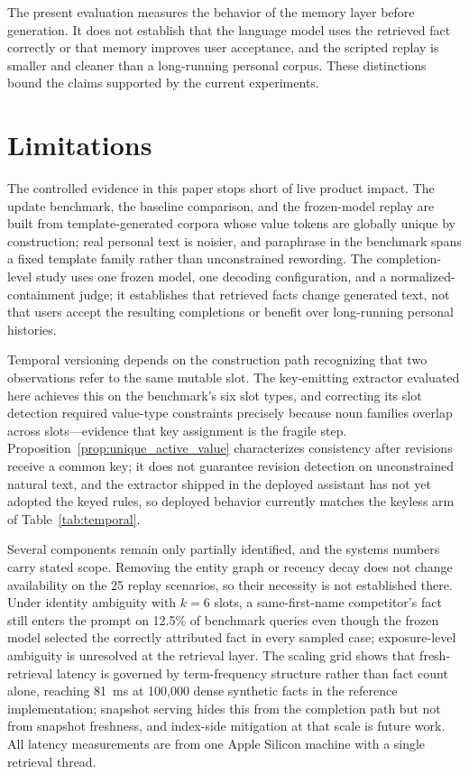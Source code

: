 \documentclass[letterpaper]{article} %
\begin{document}
The present evaluation measures the behavior of the memory layer before generation. It does not establish that the language model uses the retrieved fact correctly or that memory improves user acceptance, and the scripted replay is smaller and cleaner than a long-running personal corpus. These distinctions bound the claims supported by the current experiments.

\section{Limitations}

The controlled evidence in this paper stops short of live product impact. The update benchmark, the baseline comparison, and the frozen-model replay are built from template-generated corpora whose value tokens are globally unique by construction; real personal text is noisier, and paraphrase in the benchmark spans a fixed template family rather than unconstrained rewording. The completion-level study uses one frozen model, one decoding configuration, and a normalized-containment judge; it establishes that retrieved facts change generated text, not that users accept the resulting completions or benefit over long-running personal histories.

Temporal versioning depends on the construction path recognizing that two observations refer to the same mutable slot. The key-emitting extractor evaluated here achieves this on the benchmark's six slot types, and correcting its slot detection required value-type constraints precisely because noun families overlap across slots---evidence that key assignment is the fragile step. Proposition~\ref{prop:unique_active_value} characterizes consistency after revisions receive a common key; it does not guarantee revision detection on unconstrained natural text, and the extractor shipped in the deployed assistant has not yet adopted the keyed rules, so deployed behavior currently matches the keyless arm of Table~\ref{tab:temporal}.

Several components remain only partially identified, and the systems numbers carry stated scope. Removing the entity graph or recency decay does not change availability on the 25 replay scenarios, so their necessity is not established there. Under identity ambiguity with $k{=}6$ slots, a same-first-name competitor's fact still enters the prompt on 12.5\% of benchmark queries even though the frozen model selected the correctly attributed fact in every sampled case; exposure-level ambiguity is unresolved at the retrieval layer. The scaling grid shows that fresh-retrieval latency is governed by term-frequency structure rather than fact count alone, reaching 81~ms at 100{,}000 dense synthetic facts in the reference implementation; snapshot serving hides this from the completion path but not from snapshot freshness, and index-side mitigation at that scale is future work. All latency measurements are from one Apple Silicon machine with a single retrieval thread.
\end{document}
